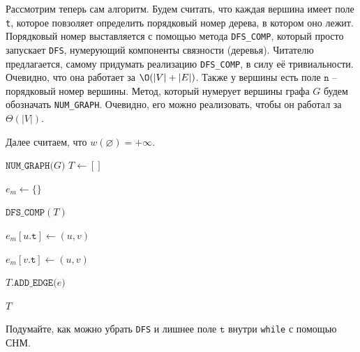 Рассмотрим теперь сам алгоритм. Будем считать, что каждая вершина имеет поле \texttt{t}, которое повзоляет определить порядковый номер дерева, в котором оно лежит.
Порядковый номер выставляется с помощью метода \texttt{DFS\_COMP}, который просто запускает \texttt{DFS}, нумерующий компоненты связности (деревья).
Читателю предлагается, самому придумать реализацию \texttt{DFS\_COMP}, в силу её тривиальности. Очевидно, что она работает за $\O(|V| + |E|)$.
Также у вершины есть поле $\texttt{n}$ -- порядковый номер вершины. Метод, который нумерует вершины графа $G$ будем обозначать \texttt{NUM\_GRAPH}. 
Очевидно, его можно реализовать, чтобы он работал за $\Theta(|V|)$.

Далее считаем, что $w(\varnothing) = +\infty$.

\begin{algorithm}[H]
\caption{Алгоритм Борувки}
\begin{algorithmic}[1]

    \State $\texttt{NUM\_GRAPH(}G\texttt{)}$
    \State $T \gets []$

     
        \State $e_m \gets \{\}$ 
        
        \State $\texttt{DFS\_COMP}(T)$

             
                    \State $e_m[u\texttt{.t}] \gets (u, v)$
                \EndIf

                    \State $e_m[v\texttt{.t}] \gets (u, v)$
                \EndIf
            \EndIf
        \EndFor

         
            \State $T\texttt{.ADD\_EDGE(}e\texttt{)}$
        \EndFor
    \EndWhile

    \State \Return $T$
\EndFunction
\end{algorithmic}
\end{algorithm}

\Exe Подумайте, как можно убрать \texttt{DFS} и лишнее поле $\texttt{t}$ внутри \texttt{while} с помощью СНМ. 

